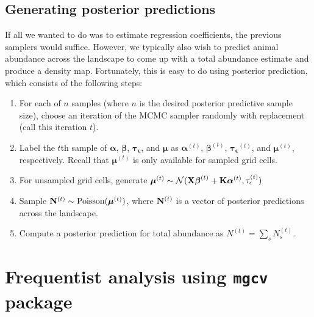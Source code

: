\documentclass[12pt,fleqn]{article}
\begin{document}
\begin{flushleft}
\subsection{Generating posterior predictions}
If all we wanted to do was to estimate regression coefficients, the previous samplers would suffice.  However, we typically also wish to predict animal abundance across the landscape to come up with a total abundance estimate and produce a density map.  Fortunately, this is easy to do using posterior prediction, which consists of the following steps:
\begin{enumerate}
\item For each of $n$ samples (where $n$ is the desired posterior predictive sample size), choose an iteration of the MCMC sampler randomly with replacement (call this iteration $t$).
\item Label the $t$th sample of $\boldsymbol{\alpha}$, $\boldsymbol{\beta}$, $\boldsymbol{\tau_\epsilon}$, and $\boldsymbol{\mu}$ as $\boldsymbol{\alpha}^{(t)}$, $\boldsymbol{\beta}^{(t)}$, $\boldsymbol{\tau_\epsilon}^{(t)}$, and $\boldsymbol{\mu}^{(t)}$, respectively.  Recall that $\boldsymbol{\mu}^{(t)}$ is only available for sampled grid cells.
\item For unsampled grid cells, generate $\boldsymbol{\mu}^{(t)} \sim \mathcal{N}({\bf X}\boldsymbol{\beta}^{(t)}+{\bf K}\boldsymbol{\alpha}^{(t)},\tau_\epsilon^{(t)})$
\item Sample ${\bf N}^{(t)} \sim \text{Poisson}(\boldsymbol{\mu}^{(t)})$, where ${\bf N}^{(t)}$ is a vector of posterior predictions across the landscape.
\item Compute a posterior prediction for total abundance as $N^{(t)}=\sum_s N_s^{(t)}$.
\end{enumerate}

\section{Frequentist analysis using \texttt{mgcv} package}


\end{flushleft}
\end{document}
